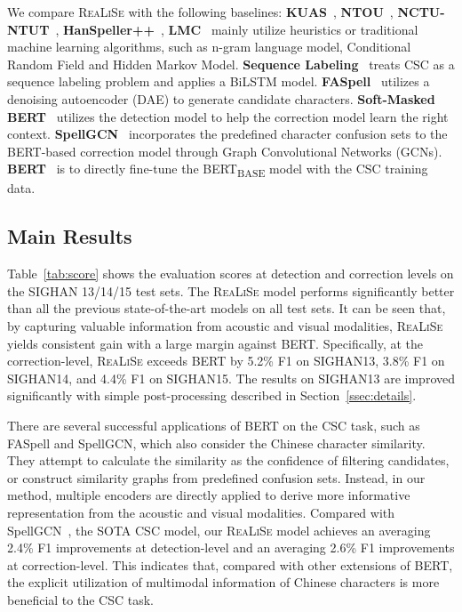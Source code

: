 \documentclass[11pt,a4paper]{article}
\newcommand\model{\textsc{ReaLiSe}}
\begin{document}
We compare \model{} with the following baselines: \textbf{KUAS}~\citep{kuas}, \textbf{NTOU}~\citep{ntou}, \textbf{NCTU-NTUT}~\citep{nctu}, \textbf{HanSpeller++}~\citep{HANSpeller++},  \textbf{LMC}~\citep{lmc} mainly utilize heuristics or traditional machine learning algorithms, such as n-gram language model, Conditional Random Field and Hidden Markov Model. \textbf{Sequence Labeling}~\citep{spell-corpus} treats CSC as a sequence labeling problem and applies a BiLSTM model. \textbf{FASpell}~\citep{FASPell} utilizes a denoising autoencoder (DAE) to generate candidate characters.
\textbf{Soft-Masked BERT}~\citep{softmask-spell} utilizes the detection model to help the correction model learn the right context.
\textbf{SpellGCN}~\citep{spellgcn} incorporates the predefined character confusion sets to the BERT-based correction model through Graph Convolutional Networks (GCNs). 
\textbf{BERT}~\citep{bert} is to directly fine-tune the BERT\textsubscript{BASE} model with the CSC training data.


















\subsection{Main Results}
\label{ssec:main-results}
Table~\ref{tab:score} shows the evaluation scores at detection and correction levels on the SIGHAN 13/14/15 test sets.
The \model{} model performs significantly better than all the previous state-of-the-art models on all test sets. It can be seen that, by capturing valuable information from acoustic and visual modalities, \model{} yields consistent gain with a large margin against BERT.
Specifically, at the correction-level, \model{} exceeds BERT by 5.2\% F1 on SIGHAN13, 3.8\% F1 on SIGHAN14, and 4.4\% F1 on SIGHAN15. 
The results on SIGHAN13 are improved significantly with simple post-processing described in Section~\ref{ssec:details}.


There are several successful applications of BERT on the CSC task, such as FASpell and SpellGCN, which also consider the Chinese character similarity. They attempt to calculate the similarity as the confidence of filtering candidates, or construct similarity graphs from predefined confusion sets. 
Instead, in our method, multiple encoders are directly applied to derive more informative representation from the acoustic and visual modalities.
Compared with SpellGCN~\citep{spellgcn}, the SOTA CSC model, our \model{} model achieves an averaging 2.4\% F1 improvements at detection-level and an averaging 2.6\% F1 improvements at correction-level.
This indicates that, compared with other extensions of BERT, the explicit utilization of multimodal information of Chinese characters is more beneficial to the CSC task.
\end{document}
